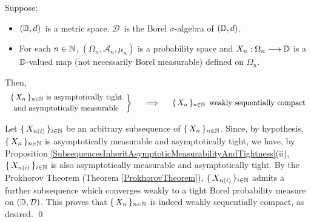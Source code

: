 \vskip 1.0cm
\begin{corollary}
\mbox{}\vskip 0.1cm
\noindent
Suppose:
\begin{itemize}
\item
	$(\mathbb{D},d)$\, is a metric space.
	$\mathcal{D}$\, is the Borel $\sigma$-algebra of $(\mathbb{D},d)$.
\item
	For each $n \in \mathbb{N}$,
	$(\Omega_{n},\mathcal{A}_{n},\mu_{n})$ is a probability space and
	$X_{n} : \Omega_{n} \longrightarrow \mathbb{D}$
	is a $\mathbb{D}$-valued map (not necessarily Borel measurable) defined on $\Omega_{n}$.
\end{itemize}
Then,
\begin{equation*}
	\left.\begin{array}{c}
	\textnormal{$\{\,X_{n}\,\}_{n\in\N}$ is asymptotically tight}
	\\
	\overset{{\color{white}.}}{\textnormal{and asymptotically measurable}}
	\end{array}\right\}
\quad\;\;\Longrightarrow\quad
	\begin{array}{c}
	\textnormal{$\{\,X_{n}\,\}_{n\in\N}$\, weakly sequentially compact}
	\end{array}
\end{equation*}
\end{corollary}
\proof
Let $\{\,X_{n(i)}\,\}_{i\in\mathbb{N}}$ be an arbitrary subsequence of $\{\,X_{n}\,\}_{n\in\mathbb{N}}$.
Since, by hypothesis, $\{\,X_{n}\,\}_{n\in\mathbb{N}}$ is asymptotically measurable and
asymptotically tight, we have,
by Proposition \ref{SubsequencesInheritAsymptoticMeasurabilityAndTightness}(ii),
$\{\,X_{n(i)}\,\}_{i\in\mathbb{N}}$ is also asymptotically measurable and
asymptotically tight.
By the Prokhorov Theorem (Theorem \ref{ProkhorovTheorem}),
$\{\,X_{n(i)}\,\}_{i\in\mathbb{N}}$ admits a further subsequence
which converges weakly to a tight Borel probability measure
on $(\mathbb{D},\mathcal{D})$.
This proves that $\{\,X_{n}\,\}_{n\in\mathbb{N}}$ is indeed
weakly sequentially compact, as desired.
\qed


\renewcommand{\theenumi}{\roman{enumi}}
\renewcommand{\labelenumi}{\textnormal{(\theenumi)}$\;\;$}

